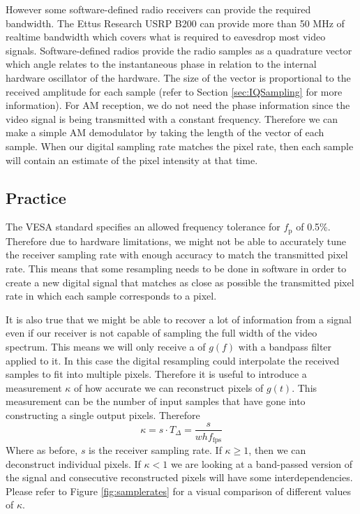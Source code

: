 \documentclass[a4paper,12pt,twoside,openright]{report}
\begin{document}
However some software-defined radio receivers can provide the required bandwidth. The Ettus Research USRP B200 can provide more than 50 MHz of realtime bandwidth which covers what is required to eavesdrop most video signals. Software-defined radios provide the radio samples as a quadrature vector which angle relates to the instantaneous phase in relation to the internal hardware oscillator of the hardware. The size of the vector is proportional to the received amplitude for each sample (refer to Section \ref{sec:IQSampling} for more information). For AM reception, we do not need the phase information since the video signal is being transmitted with a constant frequency. Therefore we can make a simple AM demodulator by taking the length of the vector of each sample. When our digital sampling rate matches the pixel rate, then each sample will contain an estimate of the pixel intensity at that time.

\subsection{Practice}
The VESA standard specifies an allowed frequency tolerance for $f_\text{p}$ of 0.5\%. Therefore due to hardware limitations, we might not be able to accurately tune the receiver sampling rate with enough accuracy to match the transmitted pixel rate. This means that some resampling needs to be done in software in order to create a new digital signal that matches as close as possible the transmitted pixel rate in which each sample corresponds to a pixel.

It is also true that we might be able to recover a lot of information from a signal even if our receiver is not capable of sampling the full width of the video spectrum. This means we will only receive a of $g(f)$ with a bandpass filter applied to it. In this case the digital resampling could interpolate the received samples to fit into multiple pixels. Therefore it is useful to introduce a measurement $\kappa$ of how accurate we can reconstruct pixels of $g(t)$. This measurement can be the number of input samples that have gone into constructing a single output pixels. Therefore
\begin{equation}
\kappa = s \cdot T_{\Delta} = \frac{s}{w h f_\text{fps}}
\end{equation}
Where as before, $s$ is the receiver sampling rate. If $\kappa \geq 1$, then we can deconstruct individual pixels. If $\kappa < 1$ we are looking at a band-passed version of the signal and consecutive reconstructed pixels will have some interdependencies. Please refer to Figure \ref{fig:samplerates} for a visual comparison of different values of $\kappa$.
\end{document}
